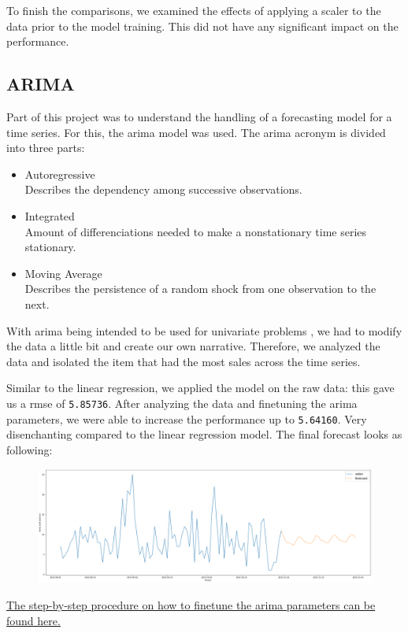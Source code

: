 To finish the comparisons, we examined the effects of applying a scaler to the data prior to the model training. This did not have any significant impact on the performance.


\subsection{ARIMA}

Part of this project was to understand the handling of a forecasting model for a time series. 
For this, the \acrfull{arima} model was used. The \acrshort{arima} acronym is divided into three parts: \cite{MultivariateStatisticsARIMA}

\begin{itemize}
	\vspace*{-3mm}
	\item Autoregressive\\
	Describes the dependency among successive observations.
	\vspace*{-3mm}
	\item Integrated\\
	Amount of differenciations needed to make a nonstationary time series stationary.
	\vspace*{-3mm}
	\item Moving Average\\
	Describes the persistence of a random shock from one observation to the next.
\end{itemize}

With \acrshort{arima} being intended to be used for univariate problems \cite{Gron2017HandsOnML}, we had to modify the data a little bit and create our own narrative. Therefore, we analyzed the data and isolated the item that had the most sales across the time series.

Similar to the linear regression, we applied the model on the raw data: this gave us a \acrshort{rmse} of \texttt{5.85736}. After analyzing the data and finetuning the \acrshort{arima} parameters, we were able to increase the performance up to \texttt{5.64160}. Very disenchanting compared to the linear regression model. The final forecast looks as following:

\begin{figure}[h]
  \centering
  \includegraphics[width=0.98\linewidth]{external_content/graphs/final_arima_forecast.png}
  \captionsetup{justification=centering}
  \label{fig:arima_forecast}
\end{figure}

\vspace*{-8mm}
\begin{center}
\href{\finalARIMAurl}{The step-by-step procedure on how to finetune the \acrshort{arima} parameters can be found here.}
\end{center}
